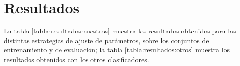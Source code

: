 



\section{Resultados}
La tabla \ref{tabla:resultados:nuestros} muestra los resultados obtenidos para las distintas estrategias de ajuste de parámetros, sobre los conjuntos de entrenamiento y de evaluación; la tabla \ref{tabla:resultados:otros} muestra los resultados obtenidos con los otros clasificadores.



